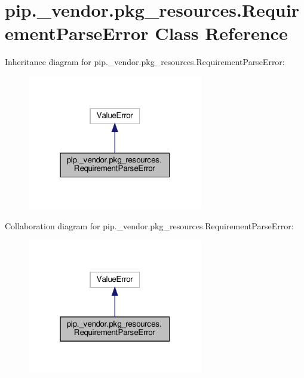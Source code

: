 \hypertarget{classpip_1_1__vendor_1_1pkg__resources_1_1RequirementParseError}{}\section{pip.\+\_\+vendor.\+pkg\+\_\+resources.\+Requirement\+Parse\+Error Class Reference}
\label{classpip_1_1__vendor_1_1pkg__resources_1_1RequirementParseError}


Inheritance diagram for pip.\+\_\+vendor.\+pkg\+\_\+resources.\+Requirement\+Parse\+Error\+:
\nopagebreak
\begin{figure}[H]
\begin{center}
\leavevmode
\includegraphics[width=217pt]{classpip_1_1__vendor_1_1pkg__resources_1_1RequirementParseError__inherit__graph}
\end{center}
\end{figure}


Collaboration diagram for pip.\+\_\+vendor.\+pkg\+\_\+resources.\+Requirement\+Parse\+Error\+:
\nopagebreak
\begin{figure}[H]
\begin{center}
\leavevmode
\includegraphics[width=217pt]{classpip_1_1__vendor_1_1pkg__resources_1_1RequirementParseError__coll__graph}
\end{center}
\end{figure}
